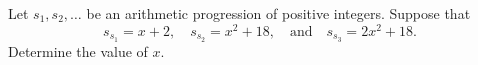 Let $s_1, s_2, \dots$ be an arithmetic progression of positive integers. Suppose that
\[ s_{s_1} = x+2, \quad s_{s_2} = x^2+18, \quad\text{and}\quad s_{s_3} = 2x^2+18. \]
Determine the value of $x$.
